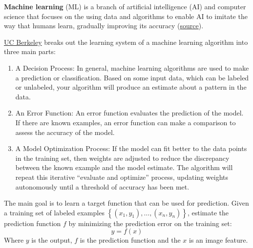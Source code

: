 \documentclass[a4paper]{article}
\newcommand{\dquotes}[1]{``#1''}
\newcommand{\highspace}{\vspace{1.2em}\noindent}
\begin{document}
    \newpage

    \begin{deepeningbox}
        \textbf{Machine learning} (ML) is a branch of artificial intelligence (AI) and computer science that focuses on the using data and algorithms to enable AI to imitate the way that humans learn, gradually improving its accuracy (\href{https://www.ibm.com/topics/machine-learning}{source}).

        \highspace
        \href{https://ischoolonline.berkeley.edu/blog/what-is-machine-learning/}{UC Berkeley} breaks out the learning system of a machine learning algorithm into three main parts:
        \begin{enumerate}
            \item A Decision Process: In general, machine learning algorithms are used to make a prediction or classification. Based on some input data, which can be labeled or unlabeled, your algorithm will produce an estimate about a pattern in the data.

            \item An Error Function: An error function evaluates the prediction of the model. If there are known examples, an error function can make a comparison to assess the accuracy of the model.

            \item A Model Optimization Process: If the model can fit better to the data points in the training set, then weights are adjusted to reduce the discrepancy between the known example and the model estimate. The algorithm will repeat this iterative \dquotes{evaluate and optimize} process, updating weights autonomously until a threshold of accuracy has been met.
        \end{enumerate}

        \highspace
        The main goal is to learn a target function that can be used for prediction. Given a training set of labeled examples $\left\{\left(x_{1}, y_{1}\right), \dots, \left(x_{n}, y_{n}\right)\right\}$, estimate the prediction function $f$ by minimizing the prediction error on the training set:
        \begin{equation*}
            y = f\left(x\right)
        \end{equation*}
        Where $y$ is the output, $f$ is the prediction function and the $x$ is an image feature.
    \end{deepeningbox}
\end{document}
